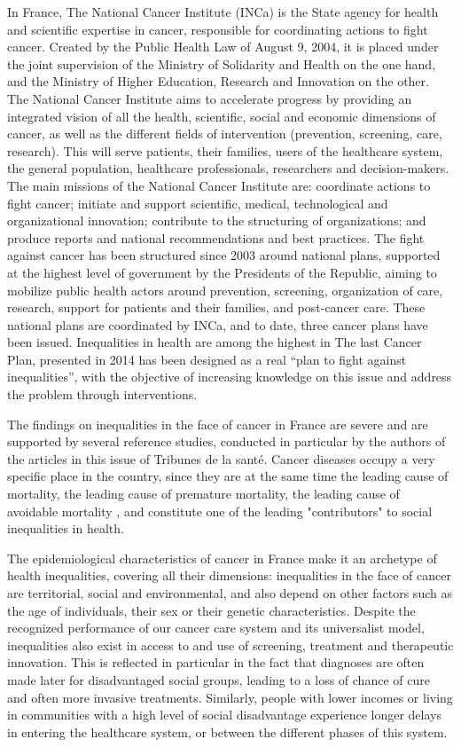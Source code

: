 In France, The National Cancer Institute (INCa) is the State agency for health
and scientific expertise in cancer, responsible for coordinating actions to
fight cancer. Created by the Public Health Law of August 9, 2004, it is placed
under the joint supervision of the Ministry of Solidarity and Health on the one
hand, and the Ministry of Higher Education, Research and Innovation on the
other. The National Cancer Institute aims to accelerate progress by providing an
integrated vision of all the health, scientific, social and economic dimensions
of cancer, as well as the different fields of intervention (prevention,
screening, care, research). This will serve patients, their families, users of
the healthcare system, the general population, healthcare professionals,
researchers and decision-makers. The main missions of the National Cancer
Institute are: coordinate actions to fight cancer; initiate and support
scientific, medical, technological and organizational innovation; contribute to
the structuring of organizations; and produce reports and national
recommendations and best practices. The fight against cancer has been structured
since 2003 around national plans, supported at the highest level of government
by the Presidents of the Republic, aiming to mobilize public health actors
around prevention, screening, organization of care, research, support for
patients and their families, and post-cancer care. These national plans are
coordinated by INCa, and to date, three cancer plans have been issued.
Inequalities in health are among the highest in The last Cancer Plan, presented
in 2014 \cite{buzyn_plan_2014} has been designed as a real ``plan to fight
against inequalities'', with the objective of increasing knowledge on this issue
and address the problem through interventions.

The findings on inequalities in the face of cancer in France are severe and are
supported by several reference studies, conducted in particular by the authors
of the articles in this issue of Tribunes de la santé. Cancer diseases occupy a
very specific place in the country, since they are at the same time the leading
cause of mortality, the leading cause of premature mortality, the leading
cause of avoidable mortality , and constitute one of the leading "contributors"
to social inequalities in health.

The epidemiological characteristics of cancer in France make it an archetype of
health inequalities, covering all their dimensions: inequalities in the face of
cancer are territorial, social and environmental, and also depend on other
factors such as the age of individuals, their sex or their genetic
characteristics.
Despite the recognized performance of our cancer care system and its
universalist model, inequalities also exist in access to and use of screening,
treatment and therapeutic innovation. This is reflected in particular in the
fact that diagnoses are often made later for disadvantaged social groups,
leading to a loss of chance of cure and often more invasive treatments.
Similarly, people with lower incomes or living in communities with a high level
of social disadvantage experience longer delays in entering the healthcare
system, or between the different phases of this system.

